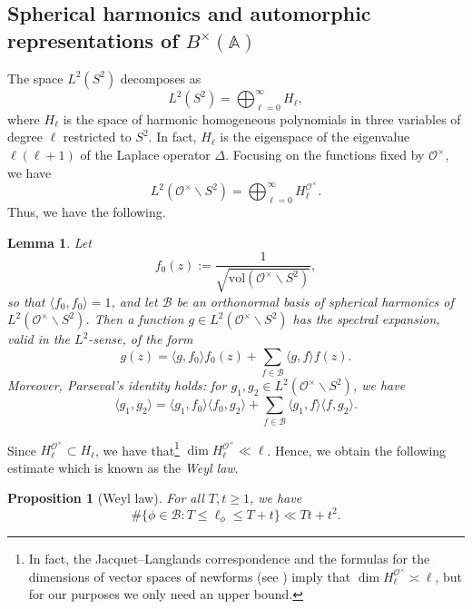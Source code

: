 \documentclass[11pt]{amsart}
\newtheorem{proposition}[theorem]{Proposition}
\newtheorem{lemma}[theorem]{Lemma}
\theoremstyle{definition}
\begin{document}
\subsection{Spherical harmonics and automorphic representations of \texorpdfstring{$B^{\times}(\mathbb{A})$}{B(A)}} \label{SphHarmBackground}

The space $L^2(S^2)$ decomposes as $$ L^2(S^2) = \bigoplus_{\ell=0}^{\infty} H_\ell,$$ where $H_\ell$ is the space of harmonic homogeneous polynomials in three variables of degree $\ell$ restricted to $S^2$. In fact, $H_\ell$ is the eigenspace of the eigenvalue $\ell(\ell+1)$ of the Laplace operator $\Delta$. Focusing on the functions fixed by $\mathcal{O}^{\times}$, we have $$ L^2(\mathcal{O}^{\times} \backslash S^2) = \bigoplus_{\ell=0}^{\infty} H_{\ell}^{\mathcal{O}^{\times}}.$$ Thus, we have the following.

\begin{lemma}\label{SpectralRes}
Let $$ f_0(z) := \frac{1}{\sqrt{\mathrm{vol}(\mathcal{O}^{\times} \backslash S^2)}},$$ so that $\langle f_0, f_0 \rangle = 1$, and let $\mathcal{B}$ be an orthonormal basis of spherical harmonics of $L^2(\mathcal{O}^{\times} \backslash S^2)$. Then a function $g \in L^2(\mathcal{O}^{\times} \backslash S^2)$ has the spectral expansion, valid in the $L^2$-sense, of the form $$ g(z) = \langle g, f_0 \rangle f_0(z) + \sum_{f\in \mathcal{B}} \langle g,f\rangle f(z).$$ Moreover, Parseval's identity holds: for $g_1, g_2 \in L^2(\mathcal{O}^{\times} \backslash S^2)$, we have $$ \langle g_1, g_2 \rangle = \langle g_1, f_0\rangle \langle f_0, g_2\rangle + \sum_{f\in \mathcal{B}} \langle g_1, f\rangle \langle f, g_2\rangle.$$
\end{lemma}

Since $H_{\ell}^{\mathcal{O}^{\times}} \subset H_{\ell}$, we have that\footnote{In fact, the Jacquet--Langlands correspondence and the formulas for the dimensions of vector spaces of newforms (see \cite[Thm.~1]{MartinDimensionsNew}) imply that $\dim{H_{\ell}^{\mathcal{O}^{\times}}} \asymp \ell$, but for our purposes we only need an upper bound.} $\dim{H_{\ell}^{\mathcal{O}^{\times}}} \ll \ell$. Hence, we obtain the following estimate which is known as the \textit{Weyl law}.

\begin{proposition}[Weyl law]\label{WeylLaw}
For all $T,t\geq 1$, we have $$ \# \{ \phi \in \mathcal{B} : T \leq \ell_{\phi} \leq T + t \} \ll Tt + t^2. $$
\end{proposition}
\end{document}
